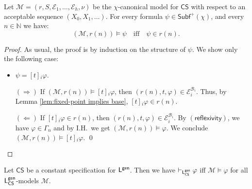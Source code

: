 \documentclass[envcountsect,envcountsame,oribibl,orivec]{llncs}
\newcommand{\jbox}[1]{\left[#1\right]\!}
\newcommand{\refax}{\ensuremath{(\textsf{reflexivity})}}
\newcommand{\CS}{\textsf{CS}}
\newcommand{\numberofagents}{h}
\newcommand{\evidence}{\mathcal{E}}
\newcommand{\valuation}{\nu}
\newcommand{\entails}{\vDash}
\newcommand{\M}{\mathcal{M}}
\newcommand{\N}{\mathbb{N}}
\renewcommand{\phi}{\varphi}
\newcommand{\Subf}{\mathsf{Subf}}
\begin{document}
\begin{lemma}
	Let $\M = (r,S,\evidence_1,\ldots,\evidence_\numberofagents, \valuation)$ be the $\chi$-canonical model for $\CS$ with respect to an acceptable sequence $(X_0, X_1, \ldots)$. For every formula $\psi \in \Subf^+ (\chi)$, and every $n \in \N$ we have:
	\[ 
	(\M, r(n)) \models \psi 
	\quad\text{if{f}}\quad
	\psi \in r(n). 
	\]
\end{lemma}
\begin{proof}
	As usual, the proof is by induction on the structure of $\psi$. We show only the following case:
	\begin{itemize}
		\item $\psi = \jbox{t}_i \phi$.
		
		$(\Rightarrow)$ If $(\M, r(n)) \models \jbox{t}_i \phi$, then $(r(n),t,\phi) \in \evidence_i^{\mathcal{B}_i}$. Thus, by Lemma \ref{lem:fixed-point implies base},  $\jbox{t}_i \phi \in r(n)$.
		
		$(\Leftarrow)$ If $\jbox{t}_i \phi \in r(n)$, then $(r(n),t,\phi) \in \evidence_i^{\mathcal{B}_i}$. By $\refax$,  we have  $\phi \in \Gamma_n$ and by I.H.~we get $(\M, r(n)) \models \phi$. We conclude $(\M, r(n)) \models \jbox{t}_i \phi$.
		\qed
	\end{itemize}
\end{proof}


\begin{theorem}\label{thm:completeness M-models-LPLTL^I generalize}
	Let  $\CS$ be a constant specification for ${\sf L}^{\sf gen}$. Then we have
	 $ \vdash_{{\sf L}^{\sf gen}_\CS} \phi$ iff $\M\entails \phi$ for all ${\sf L}^{\sf gen}_\CS$-models $\M$.
\end{theorem}
\end{document}
